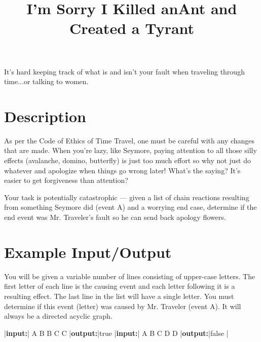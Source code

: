 \documentclass{../codeproblem}
\begin{document}
\title{I'm Sorry I Killed an}
\vspace{-3em}
\title{Ant and Created a Tyrant}

\begin{flavor}
  It's hard keeping track of what is and isn't your fault when
  traveling through time...or talking to women.
\end{flavor}

\section*{Description}
As per the Code of Ethics of Time Travel, one must be careful with any
changes that are made. When you're lazy, like Seymore, paying
attention to all those silly effects (avalanche, domino, butterfly) is
just too much effort so why not just do whatever and apologize when
things go wrong later! What's the saying? It's easier to get
forgiveness than attention?

Your task is potentially catastrophic --- given a list of chain reactions resulting
from something Seymore did (event A) and a worrying end case,
determine if the end event was Mr. Traveler's fault so he can send
back apology flowers.

\section*{Example Input/Output}
You will be given a variable number of lines consisting of upper-case
letters. The first letter of each line is the causing event and each
letter following it is a resulting effect. The last line in the
list will have a single letter. You must determine if this event
(letter) was caused by Mr. Traveler (event A). It will always be a
directed acyclic graph.

\begin{example}
|\textbf{input:}|
A B 
B C
C
|\textbf{output:}|true
|\textbf{input:}|
A B
C D
D
|\textbf{output:}|false
|\end{example}
\end{document}
